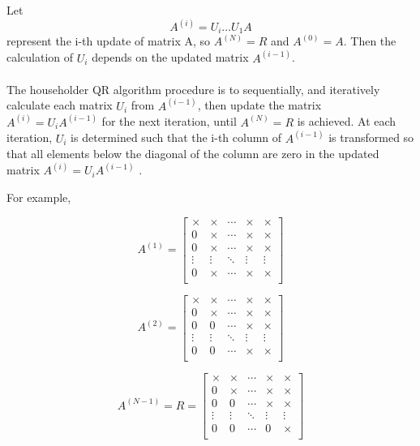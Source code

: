 \documentclass{article}
\begin{document}
Let 
\begin{equation}
A^{(i)}=U_{i} \dots U_1A
\end{equation}
represent the i-th update of matrix A, so $A^{(N)}=R$ and $A^{(0)} = A$. Then the calculation of $U_i$ depends on the updated matrix $A^{(i-1)}$.
\paragraph{}
The householder QR algorithm procedure is to sequentially, and iteratively calculate each matrix $U_i$ from $A^{(i-1)}$, then update the matrix $A^{(i)} = U_iA^{(i-1)}$ for the next iteration, until $A^{(N)}=R$ is achieved. At each iteration, $U_i$ is determined such that the i-th column of $A^{(i-1)}$ is transformed so that all elements below the diagonal of the column are zero in the updated matrix $A^{(i)} = U_iA^{(i-1)}$ \cite{golub} \cite{doi:10.1137/19M1296367}.

For example,

\begin{equation}
A^{(1)} =
\begin{bmatrix}
\times & \times & \cdots & \times & \times\\
0 & \times  & \cdots & \times & \times\\
0 & \times  & \cdots & \times & \times\\
\vdots & \vdots  & \ddots & \vdots & \vdots\\
0 & \times  & \cdots & \times & \times\\
\end{bmatrix}
\end{equation}

\begin{equation}
A^{(2)} =
\begin{bmatrix}
\times & \times & \cdots & \times & \times\\
0 & \times  & \cdots & \times & \times\\
0 & 0 & \cdots & \times & \times\\
\vdots & \vdots  & \ddots & \vdots & \vdots\\
0 & 0  & \cdots & \times & \times\\
\end{bmatrix}
\end{equation}

\begin{equation}
A^{(N-1)} = R =
\begin{bmatrix}
\times & \times & \cdots & \times & \times\\
0 & \times  & \cdots & \times & \times\\
0 & 0 & \cdots & \times & \times\\
\vdots & \vdots  & \ddots & \vdots & \vdots\\
0 & 0  & \cdots & 0 & \times\\
\end{bmatrix}
\end{equation}
\end{document}
